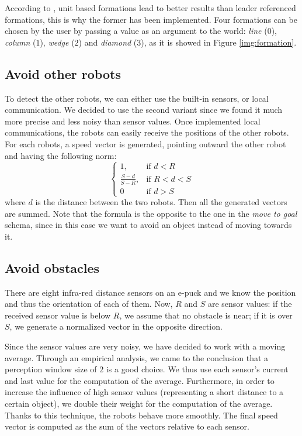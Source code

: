 \documentclass[journal]{IEEEtran}
\begin{document}
According to \cite{IEEEhowto:balch_behaviour_based}, unit based formations lead to better results than leader referenced formations, this is why the former has been implemented. Four formations can be chosen by the user by passing a value as an argument to the world: \textit{line} ($0$), \textit{column} ($1$), \textit{wedge} ($2$) and \textit{diamond} ($3$), as it is showed in Figure \ref{img:formation}. 

\subsection{Avoid other robots}
To detect the other robots, we can either use the built-in sensors, or local communication. We decided to use the second variant since we found it much more precise and less noisy than sensor values. Once implemented local communications, the robots can easily receive the
positions of the other robots. For each robots, a speed vector is generated, pointing outward the other robot and having the following norm:
\begin{equation}
\begin{cases} 1, & \mbox{if }  d<R \\ \frac{S-d}{S-R}, & \mbox{if }
  R<d<S \\ 0 & \mbox{if } d>S\end{cases}
\end{equation}
where $d$ is the distance between the two robots. Then all the generated vectors
are summed. Note that the formula is the opposite to the one in the
\textit{move to goal} schema, since in this case we want to avoid an object
instead of moving towards it.

\subsection{Avoid obstacles}
There are eight infra-red distance sensors on an e-puck and we know the position and thus the orientation of each of them. Now, $R$ and $S$ are sensor values: if the received sensor value is below $R$, we assume that no obstacle is near; if it is over $S$, we generate a normalized vector in the opposite direction. 

Since the sensor values are very noisy, we have decided to work with a moving average. Through an empirical analysis, we came to the conclusion that a perception window size of $2$ is a good choice. We thus use each sensor's current and last value for the computation of the average. Furthermore, in order to increase the influence of high sensor values (representing a short distance to a certain object), we double their weight for the computation of the average. Thanks to this technique, the robots behave more smoothly. The final speed vector is computed as the sum of the vectors relative to each sensor.
\end{document}
